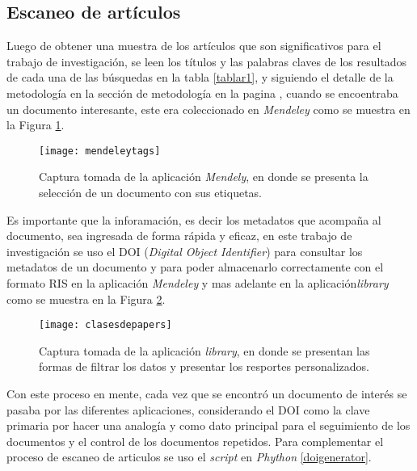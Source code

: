   \subsection{Escaneo de artículos}
  Luego de obtener una muestra de los artículos que son significativos para el trabajo de investigación, se leen los títulos y las palabras claves de los resultados de cada una de las búsquedas en la tabla \ref{tablar1}, y siguiendo el detalle de la metodología en la sección de metodología en la pagina \pageref{escaneodepapers},  cuando se encoentraba un documento interesante, este era coleccionado en \textit{Mendeley} como se muestra en la Figura \ref{mendeleytags}.
  
  \begin{figure}[h]
  	\centering
  	\texttt{[image: mendeleytags]}
  	\caption{Captura tomada de la aplicación \textit{Mendely}, en donde se presenta la selección de un documento con sus etiquetas.}
  	\label{mendeleytags}
  \end{figure}
  
  Es importante que la inforamación, es decir los metadatos que acompaña al documento, sea ingresada de forma rápida y eficaz, en este trabajo de investigación se uso el DOI (\textit{Digital Object Identifier}) para consultar los metadatos de un documento y para poder almacenarlo correctamente con el formato RIS en la aplicación \textit{Mendeley} y mas adelante en la aplicación\textit{library} como se muestra en la Figura \ref{clasesdepapers}.
  
  \begin{figure}[h]
  	\centering
  	\texttt{[image: clasesdepapers]}
  	\caption{Captura tomada de la aplicación \textit{library}, en donde se presentan las formas de filtrar los datos y presentar los resportes personalizados.}
  	\label{clasesdepapers}
  \end{figure}  

  Con este proceso en mente, cada vez que se encontró un documento de interés se pasaba por las diferentes aplicaciones, considerando el DOI como la clave primaria por hacer una analogía y como dato principal para el seguimiento de los documentos y el control de los documentos repetidos. Para complementar el proceso  de escaneo de articulos se uso el \textit{script} en \textit{Phython}  \ref{doigenerator}.
  
  
  
